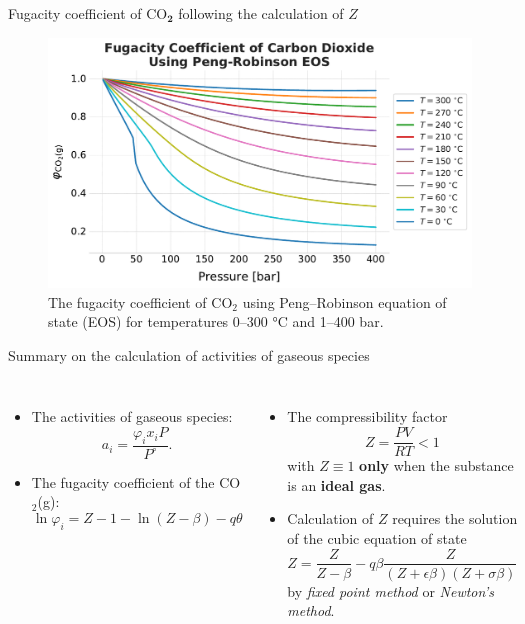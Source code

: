 \begin{frame}{Fugacity coefficient of CO$_{\boldsymbol{2}}$ following the calculation of $Z$}

\begin{figure}
\begin{centering}
\includegraphics[height=0.8\textheight]{figures/activity-models/fugacity-coefficient-co2-peng-robinson}
\par\end{centering}
\caption{The fugacity coefficient of CO$_{2}$ using Peng--Robinson equation
of state (EOS) for temperatures 0–300 °C and 1–400 bar. }
\end{figure}

\end{frame}
%
%
\begin{frame}{Summary on the calculation of activities of gaseous species}
\begin{columns}[t]

\begin{itemize}[<+->]
\item  The \alert{activities of gaseous species}:
\[
a_{i}=\frac{\varphi_{i}x_{i}P}{P^{\circ}}.
\]
\item The \alert{fugacity coefficient} of the CO$_{2}$(g):
\[
\ln\varphi_{i}=Z-1-\ln(Z-\beta)-q\theta
\]
\end{itemize}

\begin{itemize}[<+->]
\item  The \alert{compressibility factor} 
\[
Z=\frac{PV}{RT} < 1
\]
with $Z\equiv1$ \textbf{only} when the substance is an \textbf{ideal gas}.
%
\item Calculation of $Z$ requires the solution of the \alert{cubic equation of state}
\[
Z=\frac{Z}{Z-\beta}-q\beta\frac{Z}{(Z+\epsilon\beta)(Z+\sigma\beta)}
\]
by \emph{fixed point method} or \emph{Newton's method}.
\end{itemize}
\end{columns}

\end{frame}
%

